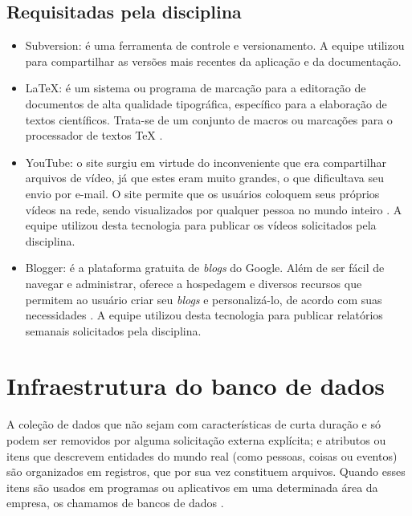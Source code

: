 \subsection{Requisitadas pela disciplina}
\begin{itemize}
    \item Subversion: é uma ferramenta de controle e versionamento. A equipe utilizou para compartilhar as versões mais recentes da aplicação e da documentação.

    \item \LaTeX:  é um sistema ou programa de marcação para a editoração de documentos de alta qualidade tipográfica, específico para a elaboração de textos científicos. Trata-se de um conjunto de macros ou marcações para o processador de textos TeX \cite{latex}.
    
    \item YouTube: o site surgiu em virtude do inconveniente que era compartilhar arquivos de vídeo, já que estes eram muito grandes, o que dificultava seu envio por e-mail. O site permite que os usuários coloquem seus próprios vídeos na rede, sendo visualizados por qualquer pessoa no mundo inteiro \cite{youtube}. A equipe utilizou desta tecnologia para publicar os vídeos solicitados pela disciplina.
    
    \item Blogger: é a plataforma gratuita de \textit{blogs} do Google. Além de ser fácil de navegar e administrar, oferece a hospedagem e diversos recursos que permitem ao usuário criar seu \textit{blogs} e personalizá-lo, de acordo com suas necessidades \cite{blogger}. A equipe utilizou desta tecnologia para publicar relatórios semanais  solicitados pela disciplina.
    
\end{itemize}

\section{Infraestrutura do banco de dados}

A coleção de dados que não sejam com características de curta duração e só podem ser removidos por alguma solicitação externa explícita; e atributos ou itens que descrevem entidades do mundo real (como pessoas, coisas ou eventos) são organizados em registros, que por sua vez constituem arquivos. Quando esses itens são usados ​​em programas ou aplicativos em uma determinada área da empresa, os chamamos de bancos de dados \cite{bdd}.

